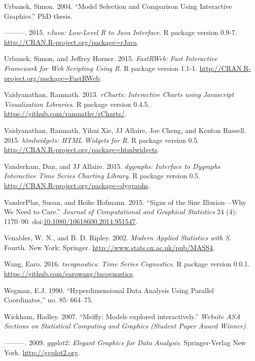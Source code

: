 \documentclass[12pt,]{isuthesis}
\begin{document}
\hypertarget{ref-Urbanek:2004}{}
Urbanek, Simon. 2004. ``Model Selection and Comparison Using Interactive
Graphics.'' PhD thesis.

\hypertarget{ref-rJava}{}
---------. 2015. \emph{rJava: Low-Level R to Java Interface}. R package
version 0.9-7. \url{http://CRAN.R-project.org/package=rJava}.

\hypertarget{ref-FastRWeb}{}
Urbanek, Simon, and Jeffrey Horner. 2015. \emph{FastRWeb: Fast
Interactive Framework for Web Scripting Using R}. R package version
1.1-1. \url{http://CRAN.R-project.org/package=FastRWeb}.

\hypertarget{ref-rCharts}{}
Vaidyanathan, Ramnath. 2013. \emph{rCharts: Interactive Charts using
Javascript Visualization Libraries}. R package version 0.4.5.
\url{https://github.com/ramnathv/rCharts/}.

\hypertarget{ref-htmlwidgets}{}
Vaidyanathan, Ramnath, Yihui Xie, JJ Allaire, Joe Cheng, and Kenton
Russell. 2015. \emph{htmlwidgets: HTML Widgets for R}. R package version
0.5. \url{http://CRAN.R-project.org/package=htmlwidgets}.

\hypertarget{ref-dygraphs}{}
Vanderkam, Dan, and JJ Allaire. 2015. \emph{dygraphs: Interface to
Dygraphs Interactive Time Series Charting Library}. R package version
0.5. \url{http://CRAN.R-project.org/package=dygraphs}.

\hypertarget{ref-sine-illusion}{}
VanderPlas, Susan, and Heike Hofmann. 2015. ``Signs of the Sine
Illusion---Why We Need to Care.'' \emph{Journal of Computational and
Graphical Statistics} 24 (4): 1170--90.
doi:\href{https://doi.org/10.1080/10618600.2014.951547}{10.1080/10618600.2014.951547}.

\hypertarget{ref-MASS}{}
Venables, W. N., and B. D. Ripley. 2002. \emph{Modern Applied Statistics
with S}. Fourth. New York: Springer.
\url{http://www.stats.ox.ac.uk/pub/MASS4}.

\hypertarget{ref-tscognostics}{}
Wang, Earo. 2016. \emph{tscognostics: Time Series Cognostics}. R package
version 0.0.1. \url{https://github.com/earowang/tscognostics}.

\hypertarget{ref-Wegman:90}{}
Wegman, E.J. 1990. ``Hyperdimensional Data Analysis Using Parallel
Coordinates,'' no. 85: 664--75.

\hypertarget{ref-Wickham:2007wq}{}
Wickham, Hadley. 2007. ``Meifly: Models explored interactively.''
\emph{Website ASA Sections on Statistical Computing and Graphics
(Student Paper Award Winner)}.

\hypertarget{ref-ggplot2}{}
---------. 2009. \emph{ggplot2: Elegant Graphics for Data Analysis}.
Springer-Verlag New York. \url{http://ggplot2.org}.
\end{document}
